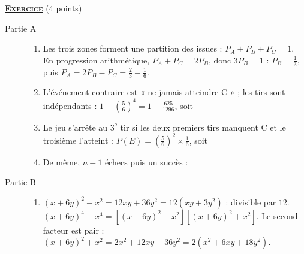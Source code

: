\providecommand{\cm}{~\mathrm{cm}}
\providecommand{\dx}{~\mathrm{d}x}
\providecommand{\dt}{\mathrm{d}t}
\providecommand{\mes}[2]{\mathrm{mes}\left( \widehat{ \overrightarrow{#1} ; \overrightarrow{#2} } \right)}
\providecommand{\Angl}[2]{\left( \widehat{ \overrightarrow{#1} , \overrightarrow{#2} } \right)}
%
\noindent \underline{\textsc{\textbf{Exercice}}} (4 points)
\begin{description}
	\item[Partie A]
	\begin{enumerate}
		\item {}
			Les trois zones forment une partition des issues : $P_A + P_B + P_C = 1$.
			En progression arithmétique, $P_A + P_C = 2P_B$, donc $3P_B = 1$ : $P_B = \frac{1}{3}$, puis $P_A = 2P_B - P_C = \frac{2}{3} - \frac{1}{6}$.
			\par\noindent{}
		\item {}
			L'événement contraire est « ne jamais atteindre C » ; les tirs sont indépendants :
			$1 - \left(\frac{5}{6}\right)^4 = 1 - \frac{625}{1296}$, soit \par\noindent{}
		\item {}
			Le jeu s'arrête au $3^{\text{e}}$ tir si les deux premiers tirs manquent C et le troisième l'atteint :
			$P(E) = \left(\frac{5}{6}\right)^2 \times \frac{1}{6}$, soit \par\noindent{}
		\item {}
			De même, $n - 1$ échecs puis un succès :
			\par\noindent{}
	\end{enumerate}
	\item[Partie B]
	\begin{enumerate}
		\item {}
			$(x + 6y)^2 - x^2 = 12xy + 36y^2 = 12\left(xy + 3y^2\right)$ : divisible par $12$.
			$(x + 6y)^4 - x^4 = \left[(x+6y)^2 - x^2\right]\left[(x+6y)^2 + x^2\right]$. Le second facteur est pair :
			$(x + 6y)^2 + x^2 = 2x^2 + 12xy + 36y^2 = 2\left(x^2 + 6xy + 18y^2\right)$.

\end{enumerate}
\end{description}
